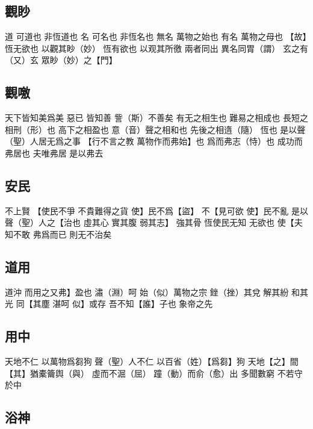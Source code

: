 \documentclass[a5paper,zihao=-4,oneside,UTF8]{ctexart}
\begin{document}
\subsection{觀眇}

道 可道也 非恆道也 名 可名也 非恆名也 無名 萬物之始也 有名 萬物之母也 【故】恆无欲也 以觀其眇（妙） 恆有欲也 以观其所徼 兩者同出 異名同胃（謂） 玄之有（又）玄 眾眇（妙）之【門】

\subsection{觀噭}

天下皆知美爲美 惡已 皆知善 訾（斯）不善矣 有无之相生也 難易之相成也 長短之相刑（形）也 高下之相盈也 意（音）聲之相和也 先後之相遀（隨） 恆也 是以聲（聖）人居无爲之事 【行不言之教 萬物作而弗始】也 爲而弗志（恃）也 成功而弗居也 夫唯弗居 是以弗去



\subsection{安民}



不上賢 【使民不爭 不貴難得之貨 使】民不爲【盜】 不【見可欲 使】民不亂 是以聲（聖）人之【治也 虛其心 實其腹 弱其志】 強其骨 恆使民无知 无欲也 使【夫知不敢 弗爲而已 則无不治矣



\subsection{道用}



道沖 而用之又弗】盈也 潚（淵）呵 始（似）萬物之宗 
銼（挫）其兌 解其紛 和其光 同【其塵 
湛呵 似】或存 
吾不知【誰】子也 象帝之先 



\subsection{用中}



天地不仁 以萬物爲芻狗 聲（聖）人不仁 以百省（姓）【爲芻】狗 
天地【之】間 【其】猶橐籥舆（與） 虛而不淈（屈） 蹱（動）而俞（愈）出 
多聞數窮 不若守於中 



\subsection{浴神}
\end{document}
